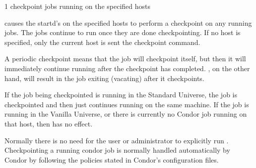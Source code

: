 \begin{ManPage}{\label{man-condor-checkpoint}}{1}
{checkpoint jobs running on the specified hosts}
\Synopsis {}

\Description
{} causes the startd's on the specified hosts to perform a 
checkpoint on any running jobs. The jobs continue to run once
they are done checkpointing. If no host is specified, only the current host is sent
the checkpoint command.

A periodic checkpoint means that the job will checkpoint itself, but then it will immediately continue running
after the checkpoint has completed. , on the other hand, will result in the job exiting (vacating) after it
checkpoints. 

If the job being checkpointed is running in the Standard Universe, the job is checkpointed and then just continues running
on the same machine. If the job is running in the Vanilla Universe, or there is currently no Condor job
running on that host, then  has no effect. 

Normally there is no need for the user or administrator to explicitly run . Checkpointing a running condor
job is normally handled automatically by Condor by following the policies stated in Condor's configuration files. 

\begin{Options}
\end{Options}

\end{ManPage}
